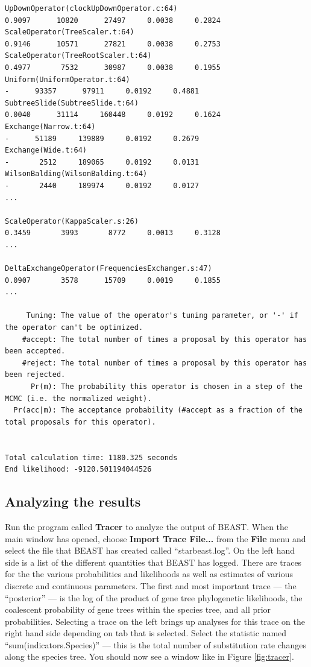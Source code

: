 \documentclass{article}
\begin{document}
{\begin{verbatim}
UpDownOperator(clockUpDownOperator.c:64)                                0.9097      10820      27497     0.0038     0.2824 
ScaleOperator(TreeScaler.t:64)                                          0.9146      10571      27821     0.0038     0.2753 
ScaleOperator(TreeRootScaler.t:64)                                      0.4977       7532      30987     0.0038     0.1955 
Uniform(UniformOperator.t:64)                                                -      93357      97911     0.0192     0.4881 
SubtreeSlide(SubtreeSlide.t:64)                                         0.0040      31114     160448     0.0192     0.1624 
Exchange(Narrow.t:64)                                                        -      51189     139889     0.0192     0.2679 
Exchange(Wide.t:64)                                                          -       2512     189065     0.0192     0.0131 
WilsonBalding(WilsonBalding.t:64)                                            -       2440     189974     0.0192     0.0127 
...

ScaleOperator(KappaScaler.s:26)                                         0.3459       3993       8772     0.0013     0.3128 
...

DeltaExchangeOperator(FrequenciesExchanger.s:47)                        0.0907       3578      15709     0.0019     0.1855 
...

     Tuning: The value of the operator's tuning parameter, or '-' if the operator can't be optimized.
    #accept: The total number of times a proposal by this operator has been accepted.
    #reject: The total number of times a proposal by this operator has been rejected.
      Pr(m): The probability this operator is chosen in a step of the MCMC (i.e. the normalized weight).
  Pr(acc|m): The acceptance probability (#accept as a fraction of the total proposals for this operator).


Total calculation time: 1180.325 seconds
End likelihood: -9120.501194044526
\end{verbatim}}

\subsection*{Analyzing the results}

Run the program called \textbf{Tracer} to analyze the output of BEAST. When the
main window has opened, choose \textbf{Import Trace File...} from the
\textbf{File} menu and select the file that BEAST has created called
``starbeast.log''. On the left hand side is a list of the different quantities
that BEAST has logged. There are traces for the the various probabilities and
likelihoods as well as estimates of various discrete and continuous parameters.
The first and most important trace --- the ``posterior'' --- is the log of the
product of gene tree phylogenetic likelihoods, the coalescent probability of
gene trees within the species tree, and all prior probabilities.
Selecting a trace on the left brings up analyses for this trace on the right
hand side depending on tab that is selected. Select the statistic named
``sum(indicators.Species)'' --- this is the total number of substitution rate
changes along the species tree. You should now see a window like in Figure
\ref{fig:tracer}.
\end{document}
